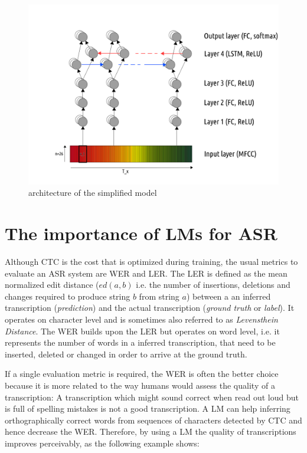 \begin{figure}
	\includegraphics[width=\linewidth]{./img/model_architecture.png}
	\caption{architecture of the simplified model}
	\label{model_architecture}
\end{figure}


\section{The importance of \ac{LM}s for \ac{ASR}}

Although \ac{CTC} is the cost that is optimized during training, the usual metrics to evaluate an \ac{ASR} system are \ac{WER} and \ac{LER}. The \ac{LER} is defined as the mean normalized edit distance ($ed(a, b)$ i.e. the number of insertions, deletions and changes required to produce string $b$ from string $a$) between a an inferred transcription (\textit{prediction}) and the actual transcription (\textit{ground truth} or \textit{label}). It operates on character level and is sometimes also referred to as \textit{Levensthein Distance}. The \ac{WER} builds upon the \ac{LER} but operates on word level, i.e. it represents the number of words in a inferred transcription, that need to be inserted, deleted or changed in order to arrive at the ground truth.

If a single evaluation metric is required, the \ac{WER} is often the better choice because it is more related to the way humans would assess the quality of a transcription: A transcription which might sound correct when read out loud but is full of spelling mistakes is not a good transcription. A \ac{LM} can help inferring orthographically correct words from sequences of characters detected by \ac{CTC} and hence decrease the \ac{WER}. Therefore, by using a \ac{LM} the quality of transcriptions improves perceivably, as the following example shows:

